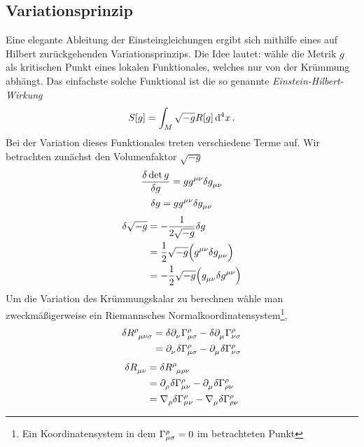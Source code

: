 \subsection{Variationsprinzip}
Eine elegante Ableitung der Einsteingleichungen ergibt sich mithilfe eines auf
Hilbert zurückgehenden Variationsprinzips. 
Die Idee lautet: wähle die Metrik $g$ als kritischen
Punkt eines lokalen Funktionales, welches nur von der Krümmung abhängt. Das
einfachste solche Funktional ist die so genannte
\emph{Einstein-Hilbert-Wirkung}
\begin{equation}
S[g]=\int_{M}\sqrt{-g}R[g] \dif{}^4x \,.
\end{equation}
Bei der Variation dieses Funktionales treten verschiedene Terme auf. Wir
betrachten zunächst den Volumenfaktor $\sqrt{-g}$
\begin{equation}
\frac{\delta \det g}{\delta g} = g 
\tensor{g}{^\mu^\nu}\delta\tensor{g}{_\mu_\nu}
\end{equation}
\begin{equation}
\delta g = g  \tensor{g}{^\mu^\nu}\delta\tensor{g}{_\mu_\nu}
\end{equation}
\begin{equation}
\begin{split}
\delta \sqrt{-g} 
&= -\frac{1}{2\sqrt{-g}}\delta g \\
&= \frac{1}{2} \sqrt{-g} \left(\tensor{g}{^\mu^\nu} \delta
\tensor{g}{_\mu_\nu}\right)\\
&= -\frac{1}{2} \sqrt{-g} \left(\tensor{g}{_\mu_\nu} \delta
\tensor{g}{^\mu^\nu}\right)
\end{split}
\end{equation}
Um die Variation des Krümmungskalar zu berechnen wähle man zweckmäßigerweise
ein Riemannsches Normalkoordinatensystem\footnote{Ein Koordinatensystem in dem
$\cSym{\rho}{\mu}{\sigma}=0$ im betrachteten Punkt},
\begin{equation}
\begin{split}
\delta \tensor{R}{^\rho_\mu_\nu_\sigma}
&=\delta \tensor{\partial}{_\nu}\cSym{\rho}{\mu}{\sigma}
-\delta \tensor{\partial}{_\mu}\cSym{\rho}{\nu}{\sigma}\\
&=\tensor{\partial}{_\nu}\delta \cSym{\rho}{\mu}{\sigma}
-\tensor{\partial}{_\mu}\delta \cSym{\rho}{\nu}{\sigma}\\
\end{split}
\end{equation}
\begin{equation}
\begin{split}
\delta \tensor{R}{_\mu_\nu}
&=\delta \tensor{R}{^\rho_\mu_\rho_\nu}\\
&=\tensor{\partial}{_\rho}\delta \cSym{\rho}{\mu}{\nu}
-\tensor{\partial}{_\mu}\delta \cSym{\rho}{\rho}{\nu}\\
&=\tensor{\nabla}{_\rho}\delta \cSym{\rho}{\mu}{\nu}
-\tensor{\nabla}{_\mu}\delta \cSym{\rho}{\rho}{\nu}\\
\end{split}
\end{equation}
